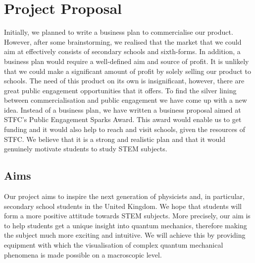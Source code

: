 \section{Project Proposal}
Initially, we planned to write a business plan to commercialise our product. However, after some brainstorming, we realised that the market that we could aim at effectively consists of secondary schools and sixth-forms. In addition, a business plan would require a well-defined aim and source of profit. It is unlikely that we could make a significant amount of profit by solely selling our product to schools. The need of this product on its own is insignificant, however, there are great public engagement opportunities that it offers. To find the silver lining between commercialisation and public engagement we have come up with a new idea. Instead of a business plan, we have written a business proposal aimed at STFC’s Public Engagement Sparks Award. This award would enable us to get funding and it would also help to reach and visit schools, given the resources of STFC. We believe that it is a strong and realistic plan and that it would genuinely motivate students to study STEM subjects.  

\subsection{Aims}

Our project aims to inspire the next generation of physicists and, in particular, secondary school students in the United Kingdom. We hope that students will form a more positive attitude towards STEM subjects. More precisely, our aim is to help students get a unique insight into quantum mechanics, therefore making the subject much more exciting and intuitive. We will achieve this by providing equipment with which the visualisation of complex quantum mechanical phenomena is made possible on a macroscopic level.

